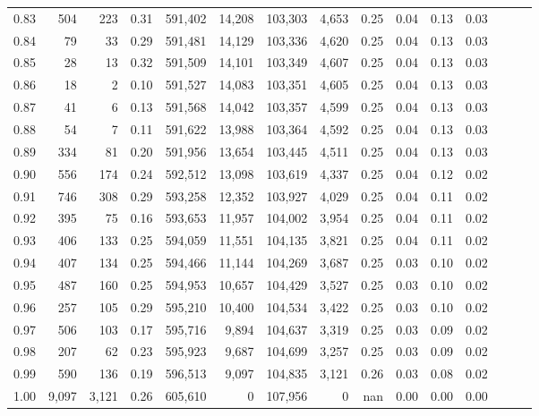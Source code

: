 \begin{tabular}{rrrrrrrrrrrrrrr}
0.83 &     504 &    223 &  0.31 &  591,402 &   14,208 &  103,303 &    4,653 &  0.25 &  0.04 &  0.13 &      0.03 \\
0.84 &      79 &     33 &  0.29 &  591,481 &   14,129 &  103,336 &    4,620 &  0.25 &  0.04 &  0.13 &      0.03 \\
0.85 &      28 &     13 &  0.32 &  591,509 &   14,101 &  103,349 &    4,607 &  0.25 &  0.04 &  0.13 &      0.03 \\
0.86 &      18 &      2 &  0.10 &  591,527 &   14,083 &  103,351 &    4,605 &  0.25 &  0.04 &  0.13 &      0.03 \\
0.87 &      41 &      6 &  0.13 &  591,568 &   14,042 &  103,357 &    4,599 &  0.25 &  0.04 &  0.13 &      0.03 \\
0.88 &      54 &      7 &  0.11 &  591,622 &   13,988 &  103,364 &    4,592 &  0.25 &  0.04 &  0.13 &      0.03 \\
0.89 &     334 &     81 &  0.20 &  591,956 &   13,654 &  103,445 &    4,511 &  0.25 &  0.04 &  0.13 &      0.03 \\
0.90 &     556 &    174 &  0.24 &  592,512 &   13,098 &  103,619 &    4,337 &  0.25 &  0.04 &  0.12 &      0.02 \\
0.91 &     746 &    308 &  0.29 &  593,258 &   12,352 &  103,927 &    4,029 &  0.25 &  0.04 &  0.11 &      0.02 \\
0.92 &     395 &     75 &  0.16 &  593,653 &   11,957 &  104,002 &    3,954 &  0.25 &  0.04 &  0.11 &      0.02 \\
0.93 &     406 &    133 &  0.25 &  594,059 &   11,551 &  104,135 &    3,821 &  0.25 &  0.04 &  0.11 &      0.02 \\
0.94 &     407 &    134 &  0.25 &  594,466 &   11,144 &  104,269 &    3,687 &  0.25 &  0.03 &  0.10 &      0.02 \\
0.95 &     487 &    160 &  0.25 &  594,953 &   10,657 &  104,429 &    3,527 &  0.25 &  0.03 &  0.10 &      0.02 \\
0.96 &     257 &    105 &  0.29 &  595,210 &   10,400 &  104,534 &    3,422 &  0.25 &  0.03 &  0.10 &      0.02 \\
0.97 &     506 &    103 &  0.17 &  595,716 &    9,894 &  104,637 &    3,319 &  0.25 &  0.03 &  0.09 &      0.02 \\
0.98 &     207 &     62 &  0.23 &  595,923 &    9,687 &  104,699 &    3,257 &  0.25 &  0.03 &  0.09 &      0.02 \\
0.99 &     590 &    136 &  0.19 &  596,513 &    9,097 &  104,835 &    3,121 &  0.26 &  0.03 &  0.08 &      0.02 \\
1.00 &   9,097 &  3,121 &  0.26 &  605,610 &        0 &  107,956 &        0 &   nan &  0.00 &  0.00 &      0.00 \\
\bottomrule
\end{tabular}

